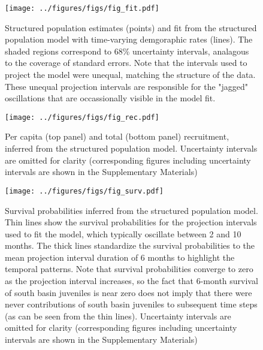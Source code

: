 \documentclass[11pt]{article}
\begin{document}

\clearpage



\clearpage
\begin{figure}
\centering
\texttt{[image: ../figures/figs/fig\_fit.pdf]}
\caption{\label{fig:fit}
Structured population estimates (points) and 
fit from the structured population model 
with time-varying demgoraphic rates (lines). 
The shaded regions correspond to 68\% uncertainty intervals,
analagous to the coverage of standard errors.
Note that the intervals used to project the model were unequal,
matching the structure of the data.
These unequal projection intervals are responsible for the "jagged" oscillations
that are occassionally visible in the model fit.
}
\end{figure}
\clearpage

\clearpage
\begin{figure}
\centering
\texttt{[image: ../figures/figs/fig\_rec.pdf]}
\caption{\label{fig:rec}
Per capita (top panel) and total (bottom panel) recruitment, 
inferred from the structured population model.
Uncertainty intervals are omitted for clarity 
(corresponding figures including uncertainty intervals are shown 
in the Supplementary Materials)
}
\end{figure}
\clearpage

\clearpage
\begin{figure}
\centering
\texttt{[image: ../figures/figs/fig\_surv.pdf]}
\caption{\label{fig:surv}
Survival probabilities inferred from the structured population model.
Thin lines show the survival probabilities for the projection intervals
used to fit the model, 
which typically oscillate between 2 and 10 months.
The thick lines standardize the survival probabilities to the mean 
projection interval duration of 6 months to highlight the temporal patterns.
Note that survival probabilities converge to zero as the projection interval increases,
so the fact that 6-month survival of south basin juveniles is near zero does not 
imply that there were never contributions of south basin juveniles to subsequent time steps
(as can be seen from the thin lines).
Uncertainty intervals are omitted for clarity 
(corresponding figures including uncertainty intervals are shown 
in the Supplementary Materials)
}
\end{figure}
\clearpage
\end{document}
